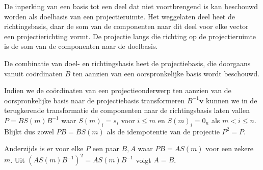 \documentclass{amsart}
\theoremstyle{definition}
\newcommand{\vvec}[1][v]{\mathbf{#1}}
\begin{document}
De inperking van een basis tot een deel dat niet voortbrengend is kan beschouwd worden als doelbasis van een projectieruimte.
Het weggelaten deel heet de richtingsbasis, daar de som van de componenten naar dit deel voor elke vector een projectierichting vormt.
De projectie langs die richting op de projectieruimte is de som van de componenten naar de doelbasis.

De combinatie van doel- en richtingsbasis heet de projectiebasis, die doorgaans vanuit coördinaten $B$ ten aanzien van een oorspronkelijke basis wordt beschouwd.

Indien we de coördinaten van een projectieonderwerp ten aanzien van de oorspronkelijke basis naar de projectiebasis transformeren $B^{-1}\vvec$ kunnen we in de terugkerende transformatie de componenten naar de richtingsbasis laten vallen $P = BS(m)B^{-1}$ waar $S(m)_i = s_i$ voor $i\leq m$ en $S(m)_i = 0_n$ als $m<i\leq n$.
Blijkt dus zowel $PB = BS(m)$ als de idempotentie van de projectie $P^2=P$.

Anderzijds is er voor elke $P$ een paar $B, A$ waar $PB = AS(m)$ voor een zekere $m$. Uit ${(AS(m)B^{-1})}^2 = AS(m)B^{-1}$ volgt $A = B$.

\newpage
\end{document}
